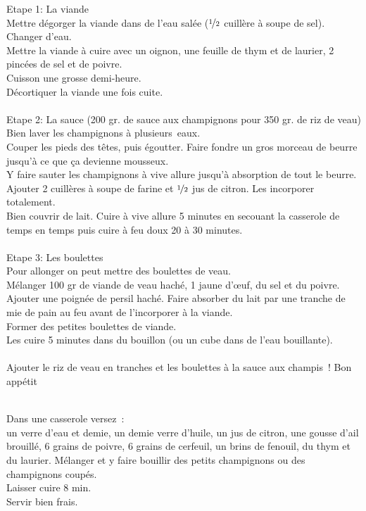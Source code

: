 \begin{minipage}[c]{\textwidth}
Etape 1: La viande\\
Mettre dégorger la viande dans de l’eau salée ($\nicefrac{1}{2}$ cuillère à soupe de sel).\\
Changer d’eau. \\
Mettre la viande à cuire avec un oignon, une feuille de thym et de laurier, 2 pincées de sel et de poivre.\\
Cuisson une grosse demi-heure.\\
Décortiquer la viande une fois cuite. \\
\\
Etape 2: La sauce (200 gr. de sauce aux champignons pour 350 gr. de riz de veau)\\
Bien laver les champignons à plusieurs eaux.\\
Couper les pieds des têtes, puis égoutter. Faire fondre un gros morceau de beurre jusqu’à ce que ça devienne mousseux. \\
Y faire sauter les champignons à vive allure jusqu’à absorption de tout le beurre. \\
Ajouter 2 cuillères à soupe de farine et $\nicefrac{1}{2}$ jus de citron. Les incorporer totalement. \\
Bien couvrir de lait. Cuire à vive allure 5 minutes en secouant la casserole de temps en temps puis cuire à feu doux 20 à 30 minutes.\\
\\
Etape 3: Les boulettes\\
Pour allonger on peut mettre des boulettes de veau.\\
Mélanger 100 gr de viande de veau haché, 1 jaune d’œuf, du sel et du poivre. \\
Ajouter une poignée de persil haché. Faire absorber du lait par une tranche de mie de pain     au feu avant de l'incorporer à la viande. \\
Former des petites boulettes de viande.\\
Les cuire 5 minutes dans du bouillon (ou un cube dans de l’eau bouillante).\\
\\
Ajouter le riz de veau en tranches et les boulettes à la sauce aux champis ! Bon appétit \\
\\

\end{minipage}

\begin{minipage}[c]{\textwidth}
Dans une casserole versez :\\
un verre d'eau et demie, un demie verre d'huile, un jus de citron, une gousse d'ail brouillé, 6 grains de poivre, 6 grains de cerfeuil, un brins de fenouil, du thym et du laurier. Mélanger et y faire bouillir des petits champignons ou des champignons coupés.\\
Laisser cuire 8 min.\\
Servir bien frais.\\
\\

\end{minipage}

